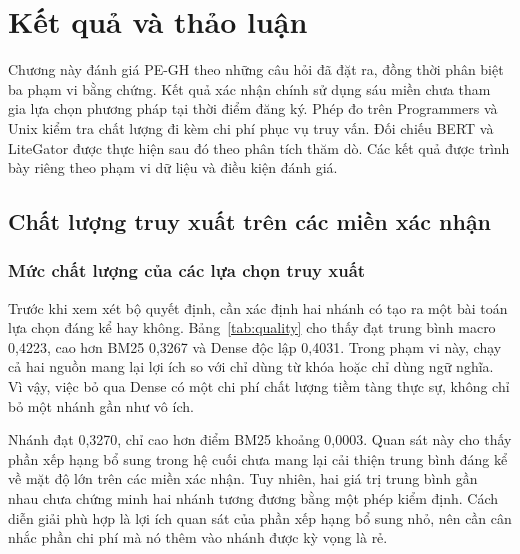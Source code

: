 \chapter{Kết quả và thảo luận}
\label{chap:results}

Chương này đánh giá PE-GH theo những câu hỏi đã đặt ra, đồng thời phân biệt ba phạm vi bằng chứng. Kết quả xác nhận chính sử dụng sáu miền chưa tham gia lựa chọn phương pháp tại thời điểm đăng ký. Phép đo trên Programmers và Unix kiểm tra chất lượng đi kèm chi phí phục vụ truy vấn. Đối chiếu BERT và LiteGator được thực hiện sau đó theo phân tích thăm dò. Các kết quả được trình bày riêng theo phạm vi dữ liệu và điều kiện đánh giá.

\section{Chất lượng truy xuất trên các miền xác nhận}
\subsection{Mức chất lượng của các lựa chọn truy xuất}
Trước khi xem xét bộ quyết định, cần xác định hai nhánh có tạo ra một bài toán lựa chọn đáng kể hay không. Bảng~\ref{tab:quality} cho thấy \Hstar{} đạt \ndcg{} trung bình macro 0,4223, cao hơn BM25 0,3267 và Dense độc lập 0,4031. Trong phạm vi này, chạy cả hai nguồn mang lại lợi ích so với chỉ dùng từ khóa hoặc chỉ dùng ngữ nghĩa. Vì vậy, việc bỏ qua Dense có một chi phí chất lượng tiềm tàng thực sự, không chỉ bỏ một nhánh gần như vô ích.

\begin{table}[htbp]
\centering\small
\caption{Chất lượng trên sáu miền xác nhận. Dòng vận hành phản ánh chính sách đã chốt, còn dòng so khớp 50\% dùng cùng số lượt Dense với các đối chứng lựa chọn truy vấn.}
\label{tab:quality}

\end{table}

Nhánh \Pstar{} đạt 0,3270, chỉ cao hơn điểm BM25 khoảng 0,0003. Quan sát này cho thấy phần xếp hạng bổ sung trong hệ cuối chưa mang lại cải thiện trung bình đáng kể về mặt độ lớn trên các miền xác nhận. Tuy nhiên, hai giá trị trung bình gần nhau chưa chứng minh hai nhánh tương đương bằng một phép kiểm định. Cách diễn giải phù hợp là lợi ích quan sát của phần xếp hạng bổ sung nhỏ, nên cần cân nhắc phần chi phí mà nó thêm vào nhánh được kỳ vọng là rẻ.

